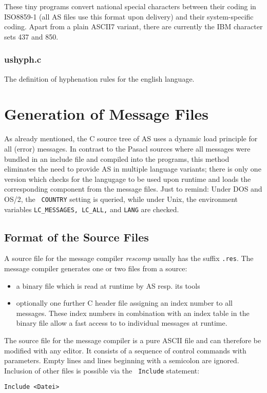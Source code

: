 \documentclass[12pt,twoside]{report}
\begin{document}
These tiny programs convert national special characters between their
coding in ISO8859-1 (all AS files use this format upon delivery) and their
system-specific coding.  Apart from a plain ASCII7 variant, there are
currently the IBM character sets 437 and 850.

\subsubsection{ushyph.c}

The definition of hyphenation rules for the english language.


\section{Generation of Message Files}

As already mentioned, the C source tree of AS uses a dynamic load
principle for all (error) messages.  In contrast to the Pasacl sources
where all messages were bundled in an include file and compiled into the
programs, this method eliminates the need to provide AS in multiple
language variants; there is only one version which checks for the
langugage to be used upon runtime and loads the corresponding component
from the message files.  Just to remind: Under DOS and OS/2, the {\tt
COUNTRY} setting is queried, while under Unix, the environment variables
{\tt LC\_MESSAGES, LC\_ALL,} and {\tt LANG} are checked.

\subsection{Format of the Source Files}

A source file for the message compiler {\em rescomp} usually has the
suffix {\tt .res}.  The message compiler generates one or two files from a
source:
\begin{itemize}   
\item{a binary file which is read at runtime by AS resp. its tools}
\item{optionally one further C header file assigning an index number to
      all messages. These index numbers in combination with an index
      table in the binary file allow a fast access to to individual
      messages at runtime.}
\end{itemize}

The source file for the message compiler is a pure ASCII file and can
therefore be modified with any editor.  It consists of a sequence of
control commands with parameters.  Empty lines and lines beginning with a
semicolon are ignored.  Inclusion of other files is possible via the {\tt
Include} statement:
\begin{verbatim}
Include <Datei> 
\end{verbatim}
\end{document}
